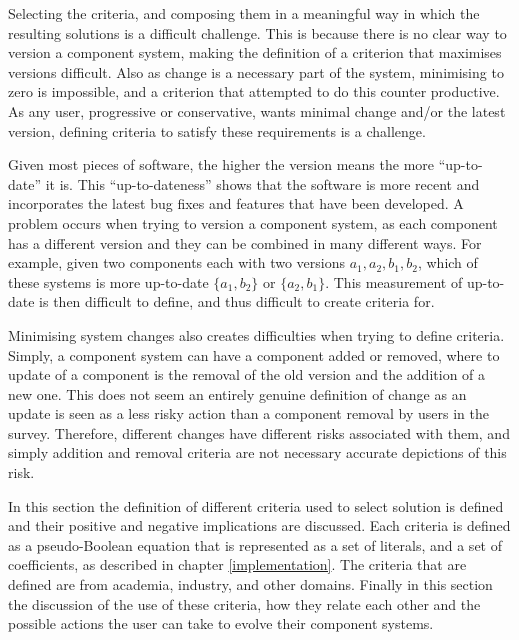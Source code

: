 Selecting the criteria, and composing them in a meaningful way in which the resulting solutions is a difficult challenge.
This is because there is no clear way to version a component system, making the definition of a criterion that maximises versions difficult.
Also as change is a necessary part of the system, minimising to zero is impossible, and a criterion that attempted to do this counter productive.
As any user, progressive or conservative, wants minimal change and/or the latest version, defining criteria to satisfy these requirements is a challenge.

Given most pieces of software, the higher the version means the more ``up-to-date'' it is.
This ``up-to-dateness'' shows that the software is more recent and incorporates the latest bug fixes and features that have been developed. 
A problem occurs when trying to version a component system, as each component has a different version and they can be combined in many different ways.
For example, given two components each with two versions $a_1,a_2,b_1,b_2$, which of these systems is more up-to-date $\{a_1,b_2\}$ or $\{a_2,b_1\}$.
This measurement of up-to-date is then difficult to define, and thus difficult to create criteria for.

Minimising system changes also creates difficulties when trying to define criteria.
Simply, a component system can have a component added or removed, where to update of a component is the removal of the old version and the addition of a new one.
This does not seem an entirely genuine definition of change as an update is seen as a less risky action than a component removal by users in the survey.  
Therefore, different changes have different risks associated with them, and simply addition and removal criteria are not necessary accurate depictions of this risk.

In this section the definition of different criteria used to select solution is defined and their positive and negative implications are discussed.
Each criteria is defined as a pseudo-Boolean equation that is represented as a set of literals, and a set of coefficients, as described in chapter \ref{implementation}.  
The criteria that are defined are from academia, industry, and other domains.
Finally in this section the discussion of the use of these criteria, how they relate each other and the possible actions the user can take to evolve their component systems.  

